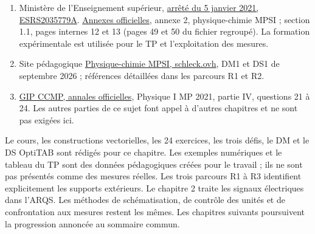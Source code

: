 \begin{enumerate}
\item Ministère de l'Enseignement supérieur, \href{https://www.education.gouv.fr/bo/21/Special1/ESRS2035779A.htm}{arrêté du 5 janvier 2021, ESRS2035779A}. \href{https://cache.media.education.gouv.fr/file/SPE1-MEN-MESRI-4-2-2021/64/8/spe779_annexe_1373648.pdf}{Annexes officielles}, annexe 2, physique-chimie MPSI ; section 1.1, pages internes 12 et 13 (pages 49 et 50 du fichier regroupé). La formation expérimentale est utilisée pour le TP et l'exploitation des mesures.
\item Site pédagogique \href{https://mpsi.schleck.ovh/}{Physique-chimie MPSI, schleck.ovh}, DM1 et DS1 de septembre 2026 ; références détaillées dans les parcours R1 et R2.
\item \href{https://concoursminesponts.fr/annales/}{GIP CCMP, annales officielles}, Physique I MP 2021, partie IV, questions 21 à 24. Les autres parties de ce sujet font appel à d'autres chapitres et ne sont pas exigées ici.
\end{enumerate}
Le cours, les constructions vectorielles, les 24 exercices, les trois défis, le DM et le DS OptiTAB sont rédigés pour ce chapitre. Les exemples numériques et le tableau du TP sont des données pédagogiques créées pour le travail ; ils ne sont pas présentés comme des mesures réelles. Les trois parcours R1 à R3 identifient explicitement les supports extérieurs.
Le chapitre 2 traite les signaux électriques dans l’ARQS. Les méthodes de schématisation, de contrôle des unités et de confrontation aux mesures restent les mêmes. Les chapitres suivants poursuivent la progression annoncée au sommaire commun.
